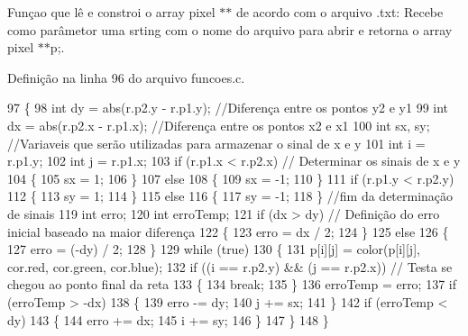 Funçao que lê e constroi o array pixel $\ast$$\ast$ de acordo com o arquivo .txt\+: Recebe como parâmetor uma srting com o nome do arquivo para abrir e retorna o array pixel $\ast$$\ast$p;. 



Definição na linha 96 do arquivo funcoes.\+c.


\begin{DoxyCode}
97 \{                                  
98     \textcolor{keywordtype}{int} dy = abs(r.p2.y - r.p1.y); \textcolor{comment}{//Diferença entre os pontos y2 e y1}
99     \textcolor{keywordtype}{int} dx = abs(r.p2.x - r.p1.x); \textcolor{comment}{//Diferença entre os pontos x2 e x1}
100     \textcolor{keywordtype}{int} sx, sy;                    \textcolor{comment}{//Variaveis que serão utilizadas para armazenar o sinal de x e y}
101     \textcolor{keywordtype}{int} i = r.p1.y;
102     \textcolor{keywordtype}{int} j = r.p1.x;
103     \textcolor{keywordflow}{if} (r.p1.x < r.p2.x) \textcolor{comment}{// Determinar os sinais de x e y}
104     \{
105         sx = 1;
106     \}
107     \textcolor{keywordflow}{else}
108     \{
109         sx = -1;
110     \}
111     \textcolor{keywordflow}{if} (r.p1.y < r.p2.y)
112     \{
113         sy = 1;
114     \}
115     \textcolor{keywordflow}{else}
116     \{
117         sy = -1;
118     \} \textcolor{comment}{//fim da determinação de sinais}
119     \textcolor{keywordtype}{int} erro;
120     \textcolor{keywordtype}{int} erroTemp;
121     \textcolor{keywordflow}{if} (dx > dy) \textcolor{comment}{// Definição do erro inicial baseado na maior diferença}
122     \{
123         erro = dx / 2;
124     \}
125     \textcolor{keywordflow}{else}
126     \{
127         erro = (-dy) / 2;
128     \}
129     \textcolor{keywordflow}{while} (\textcolor{keyword}{true})
130     \{
131         p[i][j] = color(p[i][j], cor.red, cor.green, cor.blue);
132         \textcolor{keywordflow}{if} ((i == r.p2.y) && (j == r.p2.x))                     \textcolor{comment}{// Testa se chegou ao ponto final da reta}
133         \{
134             \textcolor{keywordflow}{break};
135         \}
136         erroTemp = erro;
137         \textcolor{keywordflow}{if} (erroTemp > -dx)
138         \{
139             erro -= dy;
140             j += sx;
141         \}
142         \textcolor{keywordflow}{if} (erroTemp < dy)
143         \{
144             erro += dx;
145             i += sy;
146         \}
147     \}
148 \}
\end{DoxyCode}
\mbox{\label{funcoes_8c_a0773218f17fe8125f5861385b65c709c}} 
